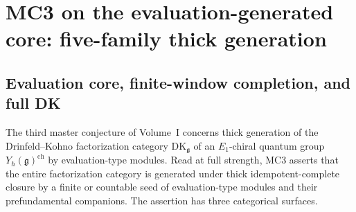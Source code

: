 
\chapter{MC3 on the evaluation-generated core: five-family thick generation}
\label{chap:mc3-five-family-platonic}

\providecommand{\ClaimStatusProvedHere}{\textsc{ProvedHere}}
\providecommand{\ClaimStatusProvedElsewhere}{\textsc{ProvedElsewhere}}
\providecommand{\ClaimStatusConditional}{\textsc{Conditional}}
\providecommand{\ClaimStatusConjectured}{\textsc{Conjectured}}

\section{Evaluation core, finite-window completion, and full DK}
\label{sec:mc3-platonic-scope}

The third master conjecture of Volume~I concerns thick generation of
the Drinfeld--Kohno factorization category
$\mathrm{DK}_\mathfrak{g}$ of an $E_1$-chiral quantum group
$Y_\hbar(\mathfrak{g})^{\mathrm{ch}}$ by evaluation-type modules.
Read at full strength, MC3 asserts that the entire factorization
category is generated under thick idempotent-complete closure by a
finite or countable seed of evaluation-type modules and their
prefundamental companions. The assertion has three categorical
surfaces.

